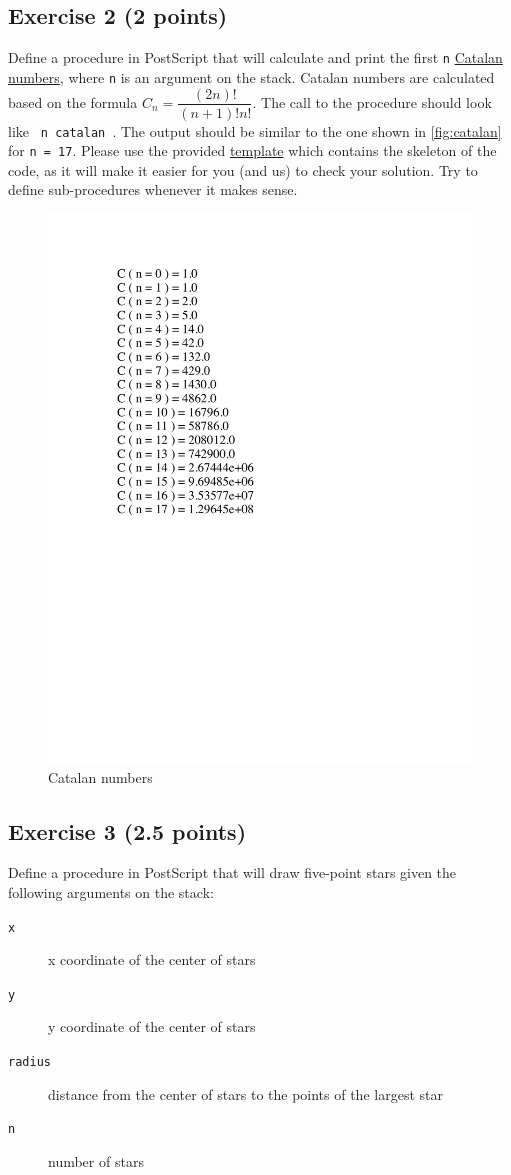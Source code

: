 \documentclass [11pt, a4wide, twoside]{article}
\begin{document}
\subsection*{Exercise 2 (2 points)}

Define a procedure in PostScript that will calculate and print the first \texttt{n} \href{https://en.wikipedia.org/wiki/Catalan_number}{Catalan numbers}, where \texttt{n} is an argument on the stack. Catalan numbers are calculated based on the formula $C_{n} = \dfrac{(2n)!}{(n+1)!n!}$.
The call to the procedure should look like \texttt{ n catalan }.
The output should be similar to the one shown in \autoref{fig:catalan} for \texttt{n = 17}.
Please use the provided \href{http://scg.unibe.ch/download/lectures/pl2018-exercises/Assignment02-catalan-template.txt}{template} which contains the skeleton of the code, as it will make it easier for you (and us) to check your solution.
Try to define sub-procedures whenever it makes sense. 


\begin{figure}[h]
\includegraphics[width=0.358\linewidth]{figs/catalanNumbers.pdf}
\caption{Catalan numbers}
\label{fig:catalan}
\end{figure}

\subsection*{Exercise 3 (2.5 points)}

Define a procedure in PostScript that will draw five-point stars given the following arguments on the stack:

\begin{description}
\item [\texttt{x}] x coordinate of the center of stars
\item [\texttt{y}] y coordinate of the center of stars
\item [\texttt{radius}] distance from the center of stars to the points of the largest star
\item [\texttt{n}] number of stars
\end{description}
\end{document}
